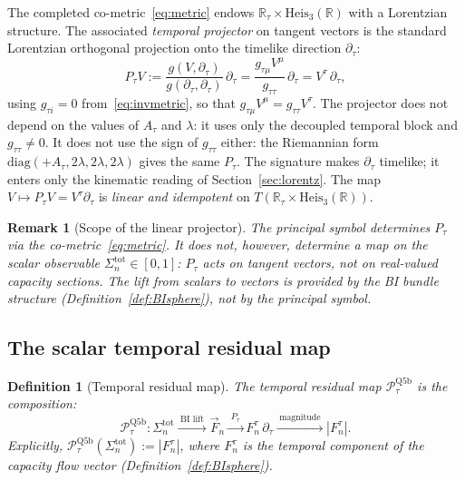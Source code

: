 \documentclass[11pt,a4paper]{article}
\newtheorem{definition}[theorem]{Definition}
\newtheorem{remark}[theorem]{Remark}
\begin{document}
      The completed co-metric~\eqref{eq:metric} endows $\mathbb{R}_\tau \times \mathrm{Heis}_3(\mathbb{R})$
      with a Lorentzian structure.
      The associated \emph{temporal projector} on tangent vectors is the standard Lorentzian
      orthogonal projection onto the timelike direction $\partial_\tau$:
      \begin{equation}\label{eq:Ptau-vector}
        P_\tau V := \frac{g(V,\partial_\tau)}{g(\partial_\tau,\partial_\tau)}\,\partial_\tau
        = \frac{g_{\tau\mu}V^\mu}{g_{\tau\tau}}\,\partial_\tau
        = V^\tau\,\partial_\tau,
      \end{equation}
      using $g_{\tau i} = 0$ from~\eqref{eq:invmetric}, so that $g_{\tau\mu}V^\mu = g_{\tau\tau}V^\tau$.
      The projector does not depend on the values of $A_\tau$ and $\lambda$: it uses only the decoupled temporal
      block and $g_{\tau\tau} \neq 0$.
      It does not use the sign of $g_{\tau\tau}$ either: the Riemannian form
      $\mathrm{diag}(+A_\tau, 2\lambda, 2\lambda, 2\lambda)$ gives the same $P_\tau$.
      The signature makes $\partial_\tau$ timelike; it enters only the kinematic reading of
      Section~\ref{sec:lorentz}.
      The map $V \mapsto P_\tau V = V^\tau\partial_\tau$ is \emph{linear and idempotent}
      on $T(\mathbb{R}_\tau \times \mathrm{Heis}_3(\mathbb{R}))$.

      \begin{remark}[Scope of the linear projector]\label{rem:scope}
        The principal symbol determines $P_\tau$ via the co-metric~\eqref{eq:metric}.
        It does not, however, determine a map on the scalar observable
        $\Sigma_n^{\mathrm{tot}} \in [0,1]$: $P_\tau$ acts on tangent vectors, not on
        real-valued capacity sections.
        The lift from scalars to vectors is provided by the BI bundle structure
        (Definition~\ref{def:BIsphere}), not by the principal symbol.
      \end{remark}

    \subsection{The scalar temporal residual map}

      \begin{definition}[Temporal residual map]\label{def:Ptau}
        The \emph{temporal residual map} $\mathcal{P}_\tau^{\mathrm{Q5b}}$ is the composition:
        \[
          \mathcal{P}_\tau^{\mathrm{Q5b}} \colon
          \Sigma_n^{\mathrm{tot}}
          \xrightarrow{\;\text{BI lift}\;}
          \vec{F}_n
          \xrightarrow{\;P_\tau\;}
          F_n^\tau\,\partial_\tau
          \xrightarrow{\;\text{magnitude}\;}
          |F_n^\tau|.
        \]
        Explicitly, $\mathcal{P}_\tau^{\mathrm{Q5b}}(\Sigma_n^{\mathrm{tot}}) := |F_n^\tau|$,
        where $F_n^\tau$ is the temporal component of the capacity flow vector
        (Definition~\ref{def:BIsphere}).
      \end{definition}
\end{document}
